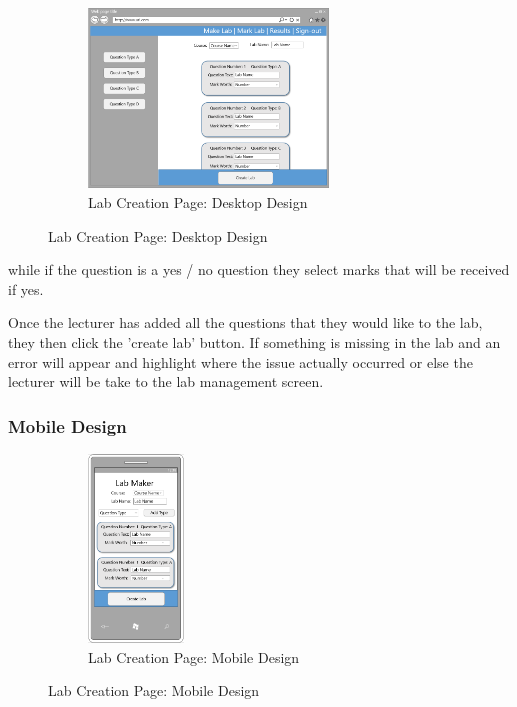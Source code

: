 \documentclass[12pt]{article}  %
\begin{document}
\begin{figure}
\vspace*{-\baselineskip}
\begin{figure}[H]
    \centering
    \includegraphics[width=0.7\textwidth]{images/design/maker-desktop.png}
    \caption{Lab Creation Page: Desktop Design}
    \label{fig:design-maker-pc}
\end{figure}
\end{figure}

\noindent while if the question is a yes / no question they select marks that will be received if yes. 

Once the lecturer has added all the questions that they would like to the lab, they then click the 'create lab' button. If something is missing in the lab and  an error will appear and highlight where the issue actually  occurred  or else the lecturer will be take to the lab management screen.


\subsubsection*{Mobile Design}

\begin{figure}
\vspace*{-\baselineskip}
\begin{figure}[H]
    \centering
    \includegraphics[width=0.28\textwidth]{images/design/maker-mobile.png}
    \caption{Lab Creation Page: Mobile Design}
    \label{fig:design-maker-mb}
\end{figure}
\end{figure}
\end{document}
